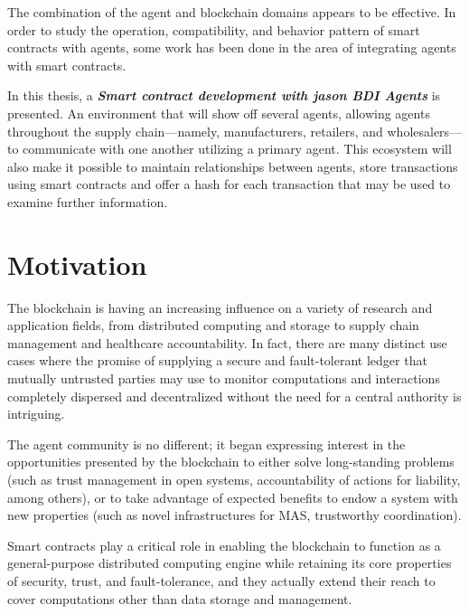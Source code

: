 \vspace{.5cm}

The combination of the agent and blockchain domains appears to be effective. In order to study the operation, compatibility, and behavior pattern of smart contracts with agents, some work has been done in the area of integrating agents with smart contracts.

\vspace{.5cm}

In this thesis, a \textbf{\textit{Smart contract development with jason \ac{BDI} Agents}} is presented. An environment that will show off several agents, allowing agents throughout the supply chain—namely, manufacturers, retailers, and wholesalers—to communicate with one another utilizing a primary agent. This ecosystem will also make it possible to maintain relationships between agents, store transactions using smart contracts and offer a hash for each transaction that may be used to examine further information.


\section{Motivation}

The blockchain is having an increasing influence on a variety of research and application fields, from distributed computing and storage to supply chain management and healthcare accountability. In fact, there are many distinct use cases where the promise of supplying a secure and fault-tolerant ledger that mutually untrusted parties may use to monitor computations and interactions completely dispersed and decentralized without the need for a central authority is intriguing. 

\vspace{.5cm}

The agent community is no different; it began expressing interest in the opportunities presented by the blockchain to either solve long-standing problems (such as trust management in open systems, accountability of actions for liability, among others), or to take advantage of expected benefits to endow a system with new properties (such as novel infrastructures for \ac{MAS}, trustworthy coordination).

\vspace{.5cm}

Smart contracts play a critical role in enabling the blockchain to function as a general-purpose distributed computing engine while retaining its core properties of security, trust, and fault-tolerance, and they actually extend their reach to cover computations other than data storage and management.

